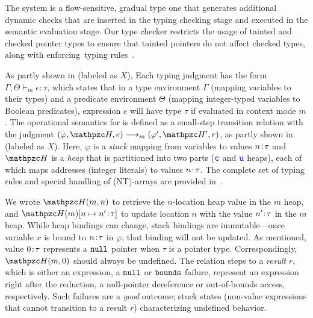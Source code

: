 The \lang system is a flow-sensitive, gradual type one that generates additional dynamic checks that are inserted in the typing checking stage and executed in the semantic evaluation stage.
Our type checker restricts the usage of tainted and checked pointer types to ensure that tainted pointers do not affect checked types, along with enforcing~\checkedc typing rules~\cite{li22checkedc}.

As partly shown in  (labeled as $X$),
Each typing judgment has the form $\Gamma;\Theta\vdash_m e : \tau$,
which states that in a type environment $\Gamma$ (mapping variables to
their types) and a predicate environment $\Theta$ (mapping integer-typed
variables to Boolean predicates), expression $e$ will have type $\tau$ if evaluated
in context mode $m$.
The operational semantics for \lang is defined as a small-step
transition relation with the judgment $ (\varphi,\heap,e)
\longrightarrow_m (\varphi',\heap',r)$, as partly shown in  (labeled as $X$).
 Here, $\varphi$ is a
\emph{stack} mapping from variables to values ${n}\!:\!{\tau}$ and
$\heap$ is a \emph{heap} that is partitioned into two parts ($\textcolor{blue}{\texttt{c}}$ and $\textcolor{blue}{\texttt{u}}$ heaps), each of which
maps addresses (integer literals) to values ${n}\!:\!{\tau}$.
The complete set of typing rules and special handling of (NT)-arrays are provided in~.

We wrote $\heap(m,n)$ to retrieve the $n$-location heap value in the $m$ heap,
and $\heapup{m}{n}{\evalue{n'}{\tau}}$ 
to update location $n$ with the value ${n'}\!:\!{\tau}$ in the $m$ heap.
While heap bindings can change, stack bindings are immutable---once
variable $x$ is bound to ${n}\!:\!{\tau}$ in $\varphi$, that binding will not
be updated. 
As mentioned, value ${0}\!:\!{\tau}$
represents a $\mathtt{null}$ pointer when $\tau$ is a pointer type.
Correspondingly, $\heap(m,0)$ should always be undefined.
% 
The relation steps to a \emph{result} $r$, which is either an
expression, a $\mathtt{null}$ or $\mathtt{bounds}$ failure, represent an expression right
  after the reduction, a null-pointer dereference or out-of-bounds access,
respectively.
% 
Such failures are a \emph{good} outcome; stuck states
(non-value expressions that cannot transition to a result $r$)
characterizing undefined behavior.

